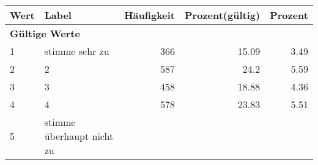      \begin{longtable}{lXrrr}
     \toprule
     \textbf{Wert} & \textbf{Label} & \textbf{Häufigkeit} & \textbf{Prozent(gültig)} & \textbf{Prozent} \\
     \endhead
     \midrule
     \multicolumn{5}{l}{\textbf{Gültige Werte}}\\

     1 &
     \multicolumn{1}{X}{ stimme sehr zu   } &


       \num{366} &
       \num[round-mode=places,round-precision=2]{15,09} &
         \num[round-mode=places,round-precision=2]{3,49} \\

     2 &
     \multicolumn{1}{X}{ 2   } &


       \num{587} &
       \num[round-mode=places,round-precision=2]{24,2} &
         \num[round-mode=places,round-precision=2]{5,59} \\

     3 &
     \multicolumn{1}{X}{ 3   } &


       \num{458} &
       \num[round-mode=places,round-precision=2]{18,88} &
         \num[round-mode=places,round-precision=2]{4,36} \\

     4 &
     \multicolumn{1}{X}{ 4   } &


       \num{578} &
       \num[round-mode=places,round-precision=2]{23,83} &
         \num[round-mode=places,round-precision=2]{5,51} \\

     5 &
     \multicolumn{1}{X}{ stimme überhaupt nicht zu   } &



\end{longtable}
